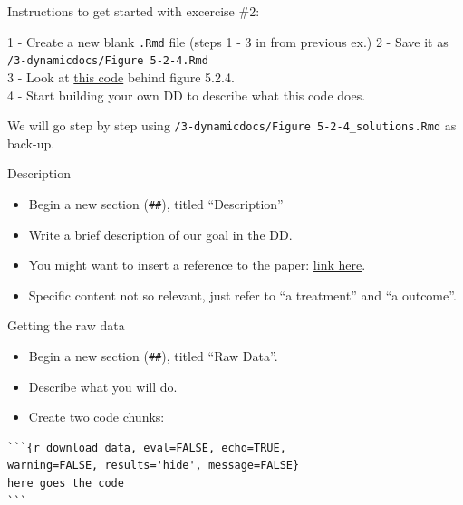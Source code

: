 \documentclass[ignorenonframetext,]{beamer}
\providecommand{\tightlist}{%
  \setlength{\itemsep}{0pt}\setlength{\parskip}{0pt}}
\begin{document}
\begin{frame}[fragile]{Instructions to get started with excercise \#2:}
\protect\hypertarget{instructions-to-get-started-with-excercise-2}{}

1 - Create a new blank \texttt{.Rmd} file (steps 1 - 3 in from previous
ex.) 2 - Save it as \texttt{/3-dynamicdocs/Figure\ 5-2-4.Rmd}\\
3 - Look at
\href{https://github.com/vikjam/mostly-harmless-replication/blob/master/05\%20Fixed\%20Effects\%2C\%20DD\%20and\%20Panel\%20Data/Figure\%205-2-4.r}{this
code} behind figure 5.2.4.\\
4 - Start building your own DD to describe what this code does.

We will go step by step using
\texttt{/3-dynamicdocs/Figure\ 5-2-4\_solutions.Rmd} as back-up.

\end{frame}

\begin{frame}[fragile]{Description}
\protect\hypertarget{description}{}

\begin{itemize}
\item
  Begin a new section (\texttt{\#\#}), titled ``Description''
\item
  Write a brief description of our goal in the DD.
\item
  You might want to insert a reference to the paper:
  \href{http://economics.mit.edu/files/589}{link here}.
\item
  Specific content not so relevant, just refer to ``a treatment'' and
  ``a outcome''.
\end{itemize}

\end{frame}

\begin{frame}[fragile]{Getting the raw data}
\protect\hypertarget{getting-the-raw-data}{}

\begin{itemize}
\tightlist
\item
  Begin a new section (\texttt{\#\#}), titled ``Raw Data''.\\
\item
  Describe what you will do.\\
\item
  Create two code chunks:
\end{itemize}

\begin{verbatim}
```{r download data, eval=FALSE, echo=TRUE, 
warning=FALSE, results='hide', message=FALSE}
here goes the code
```
\end{verbatim}

\end{frame}
\end{document}
